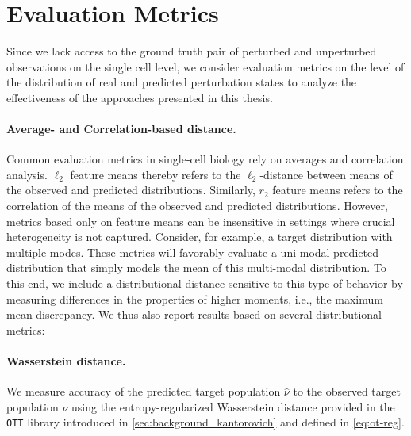 \section{Evaluation Metrics} \label{app:evaluation_metrics}

 Since we lack access to the ground truth pair of perturbed and unperturbed observations on the single cell level, we consider evaluation metrics on the level of the distribution of real and predicted perturbation states to analyze the effectiveness of the approaches presented in this thesis.

\paragraph{Average- and Correlation-based distance.} 
Common evaluation metrics in single-cell biology rely on averages and correlation analysis. $\ell_2$ feature means thereby refers to the $\ell_2$-distance between means of the observed and predicted distributions. Similarly, $r_2$ feature means refers to the correlation of the means of the observed and predicted distributions.
However, metrics based only on feature means can be insensitive in settings where crucial heterogeneity is not captured. Consider, for example, a target distribution with multiple modes. These metrics will favorably evaluate a uni-modal predicted distribution that simply models the mean of this multi-modal distribution. To this end, we include a distributional distance sensitive to this type of behavior by measuring differences in the properties of higher moments, i.e., the maximum mean discrepancy.
We thus also report results based on several distributional metrics:

\paragraph{Wasserstein distance.}
We measure accuracy of the predicted target population $\hat{\nu}$ to the observed target population $\nu$ using the entropy-regularized Wasserstein distance \citep{cuturi2013sinkhorn} provided in the \texttt{OTT} library \citep{cuturi2022optimal} introduced in \cref{sec:background_kantorovich} and defined in \eqref{eq:ot-reg}.

